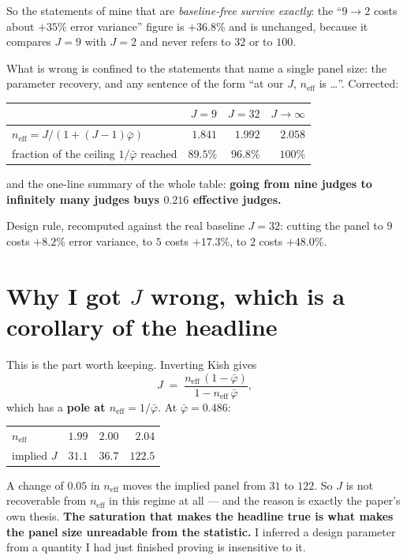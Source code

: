 \documentclass[11pt]{article}
\begin{document}
So the statements of mine that are \emph{baseline-free survive exactly}: the
``$9\to 2$ costs about $+35\%$ error variance'' figure is $+36.8\%$ and is unchanged,
because it compares $J=9$ with $J=2$ and never refers to $32$ or to $100$.

What is wrong is confined to the statements that name a single panel size: the parameter
recovery, and any sentence of the form ``at our $J$, $n_{\mathrm{eff}}$ is \ldots''.
Corrected:

\begin{center}
\begin{tabular}{lrrr}
\toprule
 & $J=9$ & $J=32$ & $J\to\infty$\\
\midrule
$n_{\mathrm{eff}}=J/(1+(J-1)\bar\varphi)$ & $1.841$ & $1.992$ & $2.058$\\
fraction of the ceiling $1/\bar\varphi$ reached & $89.5\%$ & $96.8\%$ & $100\%$\\
\bottomrule
\end{tabular}
\end{center}

\noindent and the one-line summary of the whole table: \textbf{going from nine judges to
infinitely many judges buys $0.216$ effective judges.}

Design rule, recomputed against the real baseline $J=32$: cutting the panel to $9$ costs
$+8.2\%$ error variance, to $5$ costs $+17.3\%$, to $2$ costs $+48.0\%$.

\section{Why I got $J$ wrong, which is a corollary of the headline}

This is the part worth keeping. Inverting Kish gives
\[
  J \;=\; \frac{n_{\mathrm{eff}}\,(1-\bar\varphi)}{1-n_{\mathrm{eff}}\,\bar\varphi},
\]
which has a \textbf{pole at $n_{\mathrm{eff}}=1/\bar\varphi$}. At $\bar\varphi=0.486$:

\begin{center}
\begin{tabular}{lrrr}
\toprule
$n_{\mathrm{eff}}$ & $1.99$ & $2.00$ & $2.04$\\
implied $J$ & $31.1$ & $36.7$ & $122.5$\\
\bottomrule
\end{tabular}
\end{center}

A change of $0.05$ in $n_{\mathrm{eff}}$ moves the implied panel from $31$ to $122$. So
$J$ is not recoverable from $n_{\mathrm{eff}}$ in this regime at all --- and the reason is
exactly the paper's own thesis. \textbf{The saturation that makes the headline true is what
makes the panel size unreadable from the statistic.} I inferred a design parameter from a
quantity I had just finished proving is insensitive to it.
\end{document}

